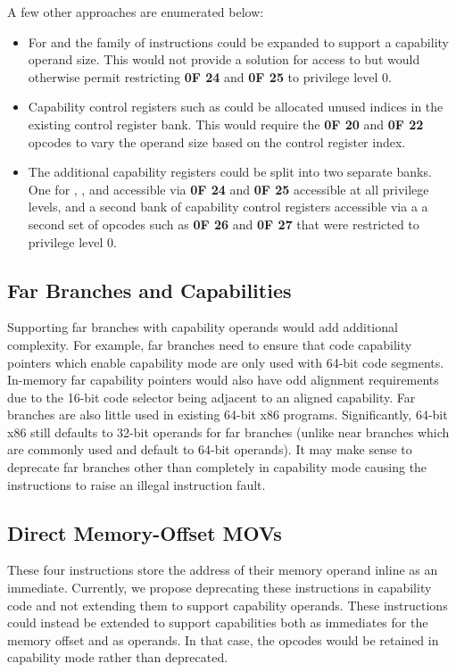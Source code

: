 A few other approaches are enumerated below:

\begin{itemize}
  \item For \CFS{} and \CGS{} the  family of
    instructions could be expanded to support a capability operand
    size.  This would not provide a solution for access to \DDC{} but
    would otherwise permit restricting \textbf{0F 24} and \textbf{0F
      25} to privilege level 0.

  \item Capability control registers such as \KGS{} could be allocated
    unused indices in the existing control register bank.  This would
    require the \textbf{0F 20} and \textbf{0F 22} opcodes to vary the
    operand size based on the control register index.

  \item The additional capability registers could be split into two
    separate banks.  One for \CFS{}, \CGS{}, and \DDC{} accessible via
    \textbf{0F 24} and \textbf{0F 25} accessible at all privilege
    levels, and a second bank of capability control registers
    accessible via a a second set of opcodes such as \textbf{0F 26}
    and \textbf{0F 27} that were restricted to privilege level 0.
\end{itemize}

\subsection{Far Branches and Capabilities}

Supporting far branches with capability operands would add additional
complexity.  For example, far branches need to ensure that code
capability pointers which enable capability mode are only used with
64-bit code segments.  In-memory far capability pointers would also
have odd alignment requirements due to the 16-bit code selector being
adjacent to an aligned capability.  Far branches are also little used
in existing 64-bit x86 programs.  Significantly, 64-bit x86 still
defaults to 32-bit operands for far branches (unlike near branches
which are commonly used and default to 64-bit operands).  It may make
sense to deprecate far branches other than  completely
in capability mode causing the instructions to raise an illegal
instruction fault.

\subsection{Direct Memory-Offset MOVs}

These four  instructions store the address of their
memory operand inline as an immediate.  Currently, we propose
deprecating these instructions in capability code and not extending
them to support capability operands.  These instructions could instead
be extended to support capabilities both as immediates for the memory
offset and as operands.  In that case, the opcodes would be retained
in capability mode rather than deprecated.
